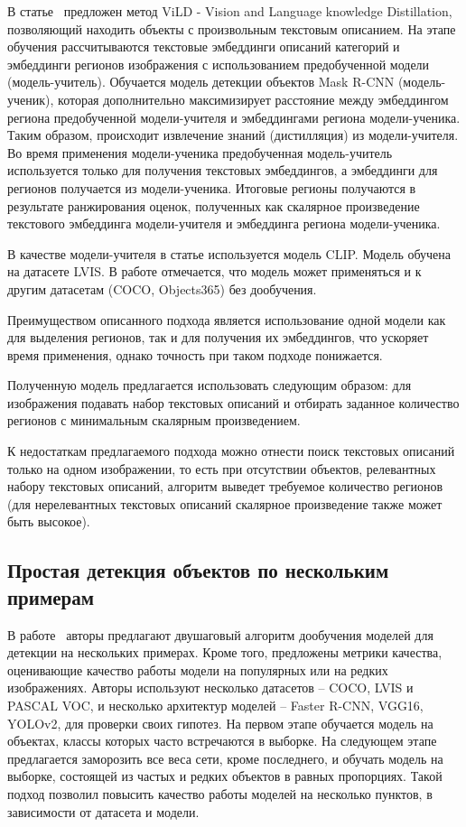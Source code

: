 \documentclass[a4paper,14pt]{article}
\begin{document}
    В статье~\cite{ViLD} предложен метод ViLD - Vision and Language knowledge Distillation, позволяющий находить объекты с произвольным текстовым описанием.
    На этапе обучения рассчитываются текстовые эмбеддинги описаний категорий и эмбеддинги регионов изображения с использованием предобученной модели (модель-учитель).
    Обучается модель детекции объектов Mask R-CNN (модель-ученик), которая дополнительно максимизирует расстояние между эмбеддингом региона предобученной модели-учителя и эмбеддингами региона модели-ученика.
    Таким образом, происходит извлечение знаний (дистилляция) из модели-учителя.
    Во время применения модели-ученика предобученная модель-учитель используется только для получения текстовых эмбеддингов, а эмбеддинги для регионов получается из модели-ученика.
    Итоговые регионы получаются в результате ранжирования оценок, полученных как скалярное произведение текстового эмбеддинга модели-учителя и эмбеддинга региона модели-ученика.

    В качестве модели-учителя в статье используется модель CLIP.
    Модель обучена на датасете LVIS. 
    В работе отмечается, что модель может применяться и к другим датасетам (COCO, Objects365) без дообучения.

    Преимуществом описанного подхода является использование одной модели как для выделения регионов, так и для получения их эмбеддингов, что ускоряет время применения, однако точность при таком подходе понижается.

    Полученную модель предлагается использовать следующим образом: для изображения подавать набор текстовых описаний и отбирать заданное количество регионов с минимальным скалярным произведением.

    К недостаткам предлагаемого подхода можно отнести поиск текстовых описаний только на одном изображении, то есть при отсутствии объектов, релевантных набору текстовых описаний, алгоритм выведет требуемое количество регионов (для нерелевантных текстовых описаний скалярное произведение также может быть высокое).

    \subsection{Простая детекция объектов по нескольким примерам}

    В работе~\cite{wang2020few} авторы предлагают двушаговый алгоритм дообучения моделей для детекции на нескольких примерах.
    Кроме того, предложены метрики качества, оценивающие качество работы модели на популярных или на редких изображениях. %
    Авторы используют несколько датасетов -- COCO, LVIS и PASCAL VOC,
    и несколько архитектур моделей -- Faster R-CNN, VGG16, YOLOv2, для проверки своих гипотез.
    На первом этапе обучается модель на объектах, классы которых часто встречаются в выборке.
    На следующем этапе предлагается заморозить все веса сети, кроме последнего, и обучать модель на выборке, состоящей из частых и редких объектов в равных пропорциях.
    Такой подход позволил повысить качество работы моделей на несколько пунктов, в зависимости от датасета и модели.
    
\end{document}
